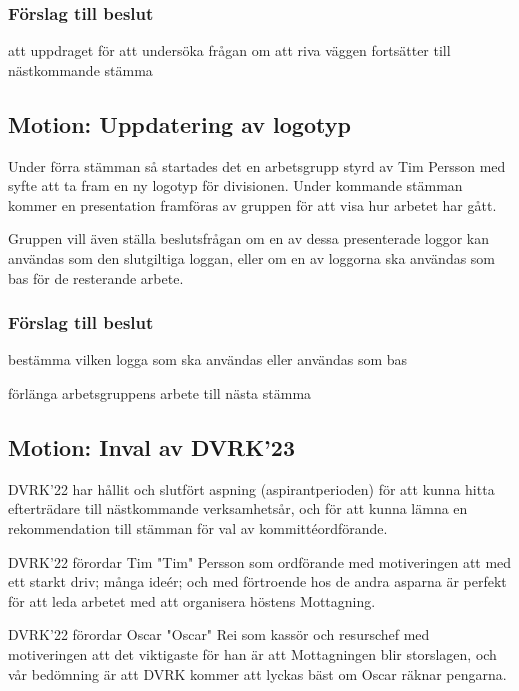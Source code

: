 \documentclass[protokoll]{dvd}
\begin{document}
\subsubsection*{Förslag till beslut}
\begin{attsatser}
    \item att uppdraget för att undersöka frågan om att riva väggen
    fortsätter till nästkommande stämma
\end{attsatser}

\subsection*{Motion: Uppdatering av logotyp}
Under förra stämman så startades det en arbetsgrupp styrd av Tim Persson
med syfte att ta fram en ny logotyp för divisionen. Under kommande stämman
kommer en presentation framföras av gruppen för att visa hur arbetet har gått.

Gruppen vill även ställa beslutsfrågan om en av dessa presenterade loggor
kan användas som den slutgiltiga loggan, eller om en av loggorna ska användas som
bas för de resterande arbete.

\subsubsection*{Förslag till beslut}
\begin{attsatser}
    \item bestämma vilken logga som ska användas eller användas som bas
    \item förlänga arbetsgruppens arbete till nästa stämma
\end{attsatser}

\subsection{Motion: Inval av DVRK'23}

DVRK'22 har hållit och slutfört aspning (aspirantperioden) för att kunna hitta efterträdare till nästkommande verksamhetsår, och för att kunna lämna en rekommendation till stämman för val av kommittéordförande.

DVRK'22 förordar Tim "Tim" Persson som ordförande med motiveringen att med ett starkt driv; många ideér; och med förtroende hos de andra asparna är perfekt för att leda arbetet med att organisera höstens Mottagning.

DVRK'22 förordar Oscar "Oscar" Rei som kassör och resurschef med motiveringen att det viktigaste för han är att Mottagningen blir storslagen, och vår bedömning är att DVRK kommer att lyckas bäst om Oscar räknar pengarna.
\end{document}
